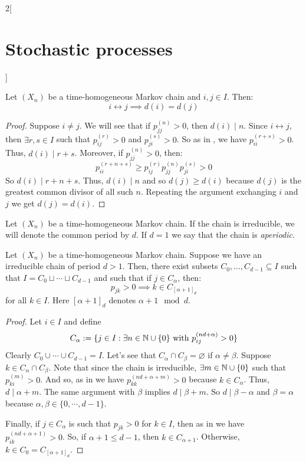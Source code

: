 \documentclass[../../../main_math.tex]{subfiles}
\begin{document}
\begin{multicols}{2}[\section{Stochastic processes}]
  \begin{proposition}\label{SP:period_classes}
    Let $(X_n)$ be a time-homogeneous Markov chain and $i,j\in I$. Then: $$i\leftrightarrow j\implies d(i)=d(j)$$
  \end{proposition}
  \begin{proof}
    Suppose $i\ne j$. We will see that if $p_{jj}^{(n)}>0$, then $d(i)\mid n$. Since $i\leftrightarrow j$, then $\exists r,s\in I$ such that $p_{ij}^{(r)}>0$ and $p_{ji}^{(s)}>0$. So as in , we have $p_{ii}^{(r+s)}>0$. Thus, $d(i)\mid r+s$. Moreover, if $p_{jj}^{(n)}>0$, then:
    $$p_{ii}^{(r+n+s)}\geq p_{ij}^{(r)}p_{jj}^{(n)}p_{ji}^{(s)}>0$$
    So $d(i)\mid r+n+s$. Thus, $d(i)\mid n$ and so $d(j)\geq d(i)$ because $d(j)$ is the greatest common divisor of all such $n$. Repeating the argument exchanging $i$ and $j$ we get $d(j)= d(i)$.
  \end{proof}
  \begin{definition}
    Let $(X_n)$ be a time-homogeneous Markov chain. If the chain is irreducible, we will denote the common period by $d$. If $d=1$ we say that the chain is \emph{aperiodic}.
  \end{definition}
  \begin{proposition}
    Let $(X_n)$ be a time-homogeneous Markov chain. Suppose we have an irreducible chain of period $d>1$. Then, there exist subsets $C_0,\ldots,C_{d-1}\subseteq I$ such that $I=C_0\sqcup\cdots\sqcup C_{d-1}$ and such that if $j\in C_\alpha$, then:
    $$p_{jk}>0\implies k\in C_{{[\alpha+1]}_d}$$
    for all $k\in I$. Here ${[\alpha+1]}_d$ denotes $\alpha+1\mod{d}$.
  \end{proposition}
  \begin{proof}
    Let $i\in I$ and define
    $$C_\alpha:=\{j\in I:\exists n\in\mathbb{N}\cup\{0\}\text{ with }p_{ij}^{(n d+\alpha)}>0\}$$
    Clearly $C_0\cup\cdots\cup C_{d-1}=I$. Let's see that $C_\alpha\cap C_\beta=\varnothing$ if $\alpha\ne\beta$. Suppose $k\in C_\alpha\cap C_\beta$. Note that since the chain is irreducible, $\exists m\in\mathbb{N}\cup\{0\}$ such that $p_{ki}^{(m)}>0$. And so, as in  we have $p_{kk}^{(n d+\alpha+m)}>0$ because $k\in C_\alpha$. Thus, $d\mid \alpha+m$. The same argument with $\beta$ implies $d\mid \beta+m$. So $d\mid \beta -\alpha$ and $\beta=\alpha$ because $\alpha,\beta\in\{0,\cdots,d-1\}$.

    Finally, if $j\in C_\alpha$ is such that $p_{jk}>0$ for $k\in I$, then as in  we have $p_{ik}^{(n d+\alpha +1)}>0$. So, if $\alpha+1\leq d-1$, then $k\in C_{\alpha+1}$. Otherwise, $k\in C_0=C_{[\alpha+1]_d}$.
  \end{proof}

\end{multicols}
\end{document}
